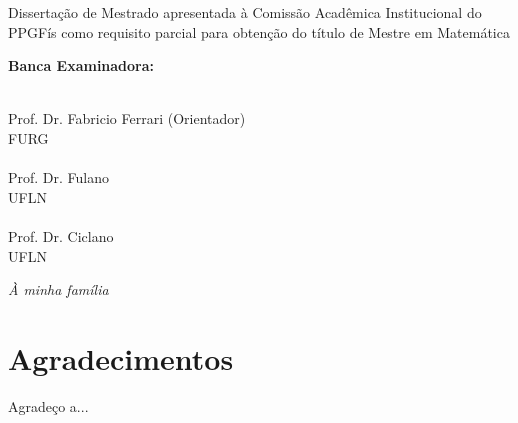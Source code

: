 \documentclass[12pt, a4paper]{report}
\begin{document}
\vspace{2.2cm}

\begin{flushright}
\begin{minipage}{8.6cm} 
Dissertação de Mestrado apresentada à \mbox{Comissão}
Acadêmica Institucional do PPGFís como requisito
parcial para obtenção do título de Mestre em
Matemática
\end{minipage}
\end{flushright}
 
\vspace{1cm}
\begin{center}
\Large \textbf{Banca Examinadora:}
\end{center}
\vspace{1.5cm}

\begin{flushright}
\begin{minipage}[l]{12cm}
\begin{center}
\uline{\hspace{10.5cm}} \\
Prof. Dr. Fabricio Ferrari (Orientador) \\ FURG \\
\vspace{1cm}
\uline{\hspace{10.5cm}} \\
Prof. Dr. Fulano \\ UFLN \\
\vspace{1cm}
\uline{\hspace{10.5cm}} \\
Prof. Dr. Ciclano \\ UFLN

\end{center}
\end{minipage}
\end{flushright}

\newpage
\vspace*{21cm}
\begin{flushright}
\textit{À minha família}
\end{flushright}


\newpage
\chapter*{Agradecimentos}
\thispagestyle{empty}

Agradeço a...
\end{document}

